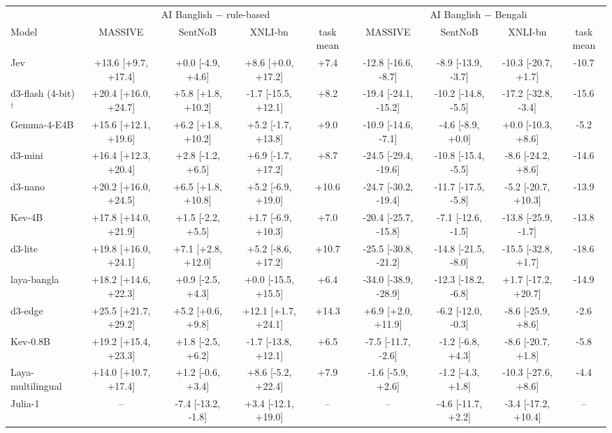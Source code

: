 \begin{tabular}{@{}lcccccccc@{}}\toprule
 & \multicolumn{4}{c}{AI Banglish $-$ rule-based} & \multicolumn{4}{c}{AI Banglish $-$ Bengali} \\\cmidrule(lr){2-5}\cmidrule(l){6-9}
Model & MASSIVE & SentNoB & XNLI-bn & task mean & MASSIVE & SentNoB & XNLI-bn & task mean \\\midrule
Jev & +13.6 [+9.7, +17.4] & +0.0 [-4.9, +4.6] & +8.6 [+0.0, +17.2] & +7.4 & -12.8 [-16.6, -8.7] & -8.9 [-13.9, -3.7] & -10.3 [-20.7, +1.7] & -10.7 \\
d3-flash (4-bit)$^\dagger$ & +20.4 [+16.0, +24.7] & +5.8 [+1.8, +10.2] & -1.7 [-15.5, +12.1] & +8.2 & -19.4 [-24.1, -15.2] & -10.2 [-14.8, -5.5] & -17.2 [-32.8, -3.4] & -15.6 \\
Gemma-4-E4B & +15.6 [+12.1, +19.6] & +6.2 [+1.8, +10.2] & +5.2 [-1.7, +13.8] & +9.0 & -10.9 [-14.6, -7.1] & -4.6 [-8.9, +0.0] & +0.0 [-10.3, +8.6] & -5.2 \\
d3-mini & +16.4 [+12.3, +20.4] & +2.8 [-1.2, +6.5] & +6.9 [-1.7, +17.2] & +8.7 & -24.5 [-29.4, -19.6] & -10.8 [-15.4, -5.5] & -8.6 [-24.2, +8.6] & -14.6 \\
d3-nano & +20.2 [+16.0, +24.5] & +6.5 [+1.8, +10.8] & +5.2 [-6.9, +19.0] & +10.6 & -24.7 [-30.2, -19.4] & -11.7 [-17.5, -5.8] & -5.2 [-20.7, +10.3] & -13.9 \\
Kev-4B & +17.8 [+14.0, +21.9] & +1.5 [-2.2, +5.5] & +1.7 [-6.9, +10.3] & +7.0 & -20.4 [-25.7, -15.8] & -7.1 [-12.6, -1.5] & -13.8 [-25.9, -1.7] & -13.8 \\
d3-lite & +19.8 [+16.0, +24.1] & +7.1 [+2.8, +12.0] & +5.2 [-8.6, +17.2] & +10.7 & -25.5 [-30.8, -21.2] & -14.8 [-21.5, -8.0] & -15.5 [-32.8, +1.7] & -18.6 \\
laya-bangla & +18.2 [+14.6, +22.3] & +0.9 [-2.5, +4.3] & +0.0 [-15.5, +15.5] & +6.4 & -34.0 [-38.9, -28.9] & -12.3 [-18.2, -6.8] & +1.7 [-17.2, +20.7] & -14.9 \\
d3-edge & +25.5 [+21.7, +29.2] & +5.2 [+0.6, +9.8] & +12.1 [+1.7, +24.1] & +14.3 & +6.9 [+2.0, +11.9] & -6.2 [-12.0, -0.3] & -8.6 [-25.9, +8.6] & -2.6 \\
Kev-0.8B & +19.2 [+15.4, +23.3] & +1.8 [-2.5, +6.2] & -1.7 [-13.8, +12.1] & +6.5 & -7.5 [-11.7, -2.6] & -1.2 [-6.8, +4.3] & -8.6 [-20.7, +1.8] & -5.8 \\
Laya-multilingual & +14.0 [+10.7, +17.4] & +1.2 [-0.6, +3.4] & +8.6 [-5.2, +22.4] & +7.9 & -1.6 [-5.9, +2.6] & -1.2 [-4.3, +1.8] & -10.3 [-27.6, +8.6] & -4.4 \\
Julia-1 & -- & -7.4 [-13.2, -1.8] & +3.4 [-12.1, +19.0] & -- & -- & -4.6 [-11.7, +2.2] & -3.4 [-17.2, +10.4] & -- \\
\bottomrule\end{tabular}
